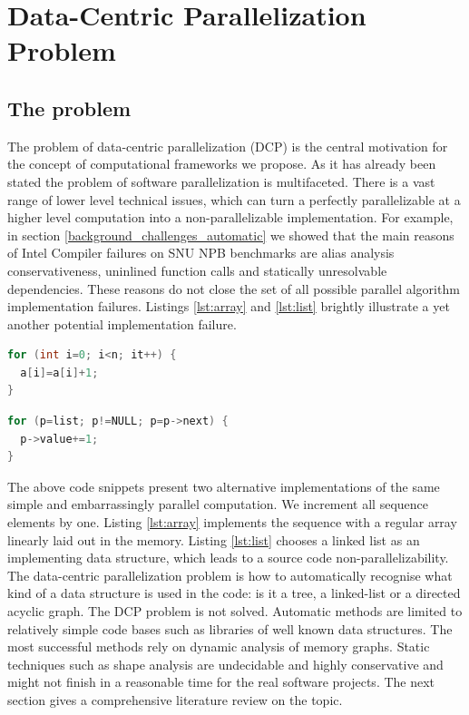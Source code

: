 \section{Data-Centric Parallelization Problem}
\label{background_dcp}
\subsection{The problem}
\label{background_dcp_problem}
\quad The problem of data-centric parallelization (DCP) is the central motivation for the concept of computational frameworks we propose. As it has already been stated the problem of software parallelization is multifaceted. There is a vast range of lower level technical issues, which can turn a perfectly parallelizable at a higher level computation into a non-parallelizable implementation. For example, in section \ref{background_challenges_automatic} we showed that the main reasons of Intel Compiler failures on SNU NPB benchmarks are alias analysis conservativeness, uninlined function calls and statically unresolvable dependencies. These reasons do not close the set of all possible parallel algorithm implementation failures. Listings \ref{lst:array} and \ref{lst:list} brightly illustrate a yet another potential implementation failure.\newline\null
\begin{minipage}[t]{0.45\linewidth}
\begin{lstlisting}[caption={Parallelisable loop operating on a \textbf{linear array}.},label={lst:array},language=C]
for (int i=0; i<n; it++) {
  a[i]=a[i]+1;
}
\end{lstlisting}
\end{minipage}
%
\begin{minipage}[t]{0.55\linewidth}
\begin{lstlisting}[caption={Non-parallelisable loop operating on a \textbf{linked-list}.},label={lst:list},language=C]
for (p=list; p!=NULL; p=p->next) {
  p->value+=1;
}
\end{lstlisting}
\end{minipage}
\quad The above code snippets present two alternative implementations of the same simple and embarrassingly parallel computation. We increment all sequence elements by one. Listing \ref{lst:array} implements the sequence with a regular array linearly laid out in the memory. Listing \ref{lst:list} chooses a linked list as an implementing data structure, which leads to a source code non-parallelizability.\newline\null
\quad The data-centric parallelization problem is how to automatically recognise what kind of a data structure is used in the code: is it a tree, a linked-list or a directed acyclic graph. The DCP problem is not solved. Automatic methods are limited to relatively simple code bases such as libraries of well known data structures. The most successful methods rely on dynamic analysis of memory graphs. Static techniques such as shape analysis are undecidable and highly conservative and might not finish in a reasonable time for the real software projects. The next section gives a comprehensive literature review on the topic.

